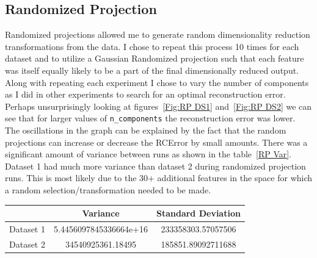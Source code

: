 \subsection{Randomized Projection}\label{subsec:randomized-projection}
Randomized projections allowed me to generate random dimensionality reduction transformations from the data.
I chose to repeat this process 10 times for each dataset and to utilize a Gaussian Randomized projection such that each
feature was itself equally likely to be a part of the final dimensionally reduced output.
Along with repeating each experiment I chose to vary the number of components as I did in other experiments to search
for an optimal reconstruction error.
Perhaps unsurprisingly looking at figures~\ref{Fig:RP DS1} and~\ref{Fig:RP DS2} we can see that for larger values of
\texttt{n\_components} the reconstruction error was lower.
The oscillations in the graph can be explained by the fact that the random projections can increase or decrease the RCError
by small amounts.
There was a significant amount of variance between runs as shown in the table~\ref{RP Var}.
Dataset 1 had much more variance than dataset 2 during randomized projection runs.
This is most likely due to the 30+ additional features in the space for which a random selection/transformation needed
to be made.
\begin{center}\label{RP Var}
    \begin{tabular}{|c| c |c|}
        \hline
        & Variance               & Standard Deviation \\
        \hline
        \hline
        Dataset 1 & 5.4456097845336664e+16 & 233358303.57057506 \\
        \hline
        Dataset 2 & 34540925361.18495      & 185851.89092711688 \\
        \hline
    \end{tabular}
\end{center}
